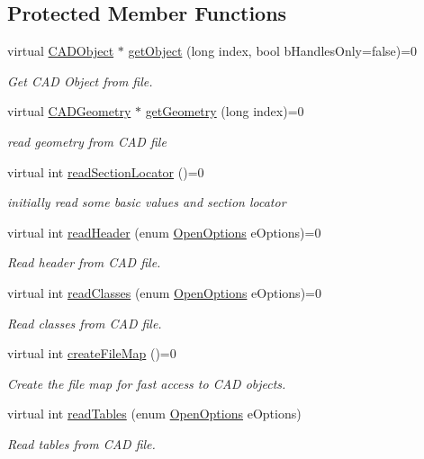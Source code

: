 \subsection*{Protected Member Functions}
\begin{DoxyCompactItemize}
\item 
virtual \hyperlink{class_c_a_d_object}{C\+A\+D\+Object} $\ast$ \hyperlink{class_c_a_d_file_a185f58e71432aa69affe49929cb44be4}{get\+Object} (long index, bool b\+Handles\+Only=false)=0
\begin{DoxyCompactList}\small\item\em Get C\+AD Object from file. \end{DoxyCompactList}\item 
virtual \hyperlink{class_c_a_d_geometry}{C\+A\+D\+Geometry} $\ast$ \hyperlink{class_c_a_d_file_a1c841beaf00d33fe888d5f750841829b}{get\+Geometry} (long index)=0
\begin{DoxyCompactList}\small\item\em read geometry from C\+AD file \end{DoxyCompactList}\item 
virtual int \hyperlink{class_c_a_d_file_a160199a6f2004ea5ed319639e2f1156e}{read\+Section\+Locator} ()=0
\begin{DoxyCompactList}\small\item\em initially read some basic values and section locator \end{DoxyCompactList}\item 
virtual int \hyperlink{class_c_a_d_file_a27a0eed4be75e5e1fcc9ca8ba9f881c8}{read\+Header} (enum \hyperlink{class_c_a_d_file_a4776c7f9fc5888cac0ee6eede900db5a}{Open\+Options} e\+Options)=0
\begin{DoxyCompactList}\small\item\em Read header from C\+AD file. \end{DoxyCompactList}\item 
virtual int \hyperlink{class_c_a_d_file_a3965f0e1668a25ce2ed06c9e8e1bffdd}{read\+Classes} (enum \hyperlink{class_c_a_d_file_a4776c7f9fc5888cac0ee6eede900db5a}{Open\+Options} e\+Options)=0
\begin{DoxyCompactList}\small\item\em Read classes from C\+AD file. \end{DoxyCompactList}\item 
virtual int \hyperlink{class_c_a_d_file_aac33914479442df31a4ab45df8e9e8a3}{create\+File\+Map} ()=0
\begin{DoxyCompactList}\small\item\em Create the file map for fast access to C\+AD objects. \end{DoxyCompactList}\item 
virtual int \hyperlink{class_c_a_d_file_a3e1d2a8827b5af6ba0ead4b746215eb7}{read\+Tables} (enum \hyperlink{class_c_a_d_file_a4776c7f9fc5888cac0ee6eede900db5a}{Open\+Options} e\+Options)
\begin{DoxyCompactList}\small\item\em Read tables from C\+AD file. \end{DoxyCompactList}\end{DoxyCompactItemize}
